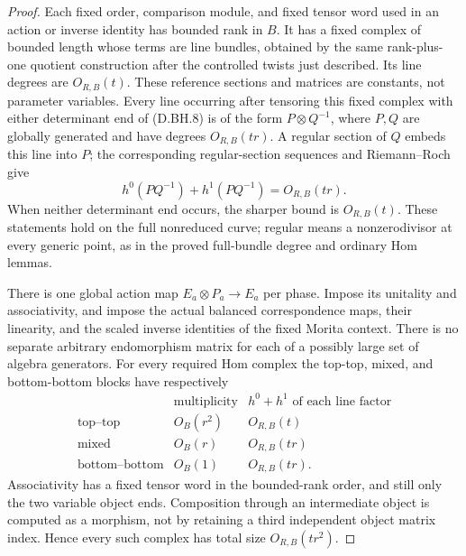 \begin{proof}
Each fixed order, comparison module, and fixed tensor
word used in an action or inverse identity has bounded
rank in $B$. It has a fixed complex of bounded length
whose terms are line bundles, obtained by the same
rank-plus-one quotient construction after the controlled
twists just described. Its line degrees are $O_{R,B}(t)$.
These reference sections and matrices are constants,
not parameter variables.
Every line occurring after tensoring this fixed complex
with either determinant end of (D.BH.8) is of the form
$P\otimes Q^{-1}$, where $P,Q$ are globally generated
and have degrees $O_{R,B}(tr)$.
A regular section of $Q$ embeds this line into $P$;
the corresponding regular-section sequences and
Riemann--Roch give
\[
 h^0(PQ^{-1})+h^1(PQ^{-1})=O_{R,B}(tr).
                                                        \tag{D.BH.9}
\]
When neither determinant end occurs, the sharper bound
is $O_{R,B}(t)$. These statements hold on the full
nonreduced curve; regular means a nonzerodivisor at
every generic point, as in the proved full-bundle
degree and ordinary Hom lemmas.

There is one global action map
$E_a\otimes P_a\to E_a$ per phase. Impose its unitality
and associativity, and impose the actual balanced
correspondence maps, their linearity, and the scaled
inverse identities of the fixed Morita context.
There is no separate arbitrary endomorphism matrix
for each of a possibly large set of algebra generators.
For every required Hom complex the top-top, mixed,
and bottom-bottom blocks have respectively
\[
 \begin{array}{c|c|c}
 &\text{multiplicity}&h^0+h^1\text{ of each line factor}\\ \hline
 \text{top--top}&O_B(r^2)&O_{R,B}(t)\\
 \text{mixed}&O_B(r)&O_{R,B}(tr)\\
 \text{bottom--bottom}&O_B(1)&O_{R,B}(tr).
 \end{array}                                           \tag{D.BH.10}
\]
Associativity has a fixed tensor word in the bounded-rank
order, and still only the two variable object ends.
Composition through an intermediate object is computed
as a morphism, not by retaining a third independent
object matrix index. Hence every such complex has
total size $O_{R,B}(tr^2)$.


\end{proof}
